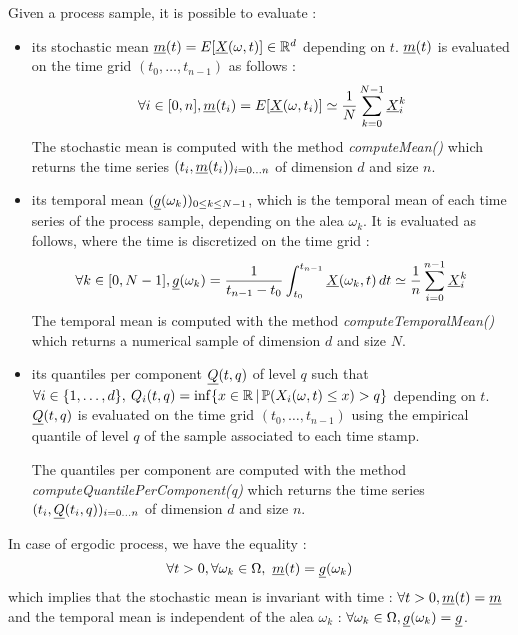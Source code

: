 Given a process sample, it is possible to evaluate :
\begin{itemize}
\item its stochastic mean  ${\underline{m}}(t) = E[\underline{X}(\omega,t)] \in \mathbb{R}^d$ depending on $t$.  ${\underline{m}}(t)$ is evaluated on the time grid $(t_0, \hdots, t_{n-1})$ as follows :
  \begin{equation}\label{stocMean}
    \forall  i\in[0,n], {\underline{m}}(t_i) = E[\underline{X}(\omega,t_i)]  \simeq \displaystyle  \frac{1}{N} \sum_{k=0}^{N-1} \underline{X}_i^k
  \end{equation}
  The stochastic mean is computed with the method \emph{computeMean()} which returns the time series  $(t_i,{\underline{m}}(t_i))_{i=0 \hdots n}$ of dimension $d$ and size $n$.

\item its temporal mean $({\underline{g}}(\omega_k))_{0 \leq k \leq N-1}$, which is the temporal mean of each time series of the process sample, depending on the alea $\omega_k$. It is evaluated as follows, where the time is discretized on the time grid :
  \begin{equation}\label{tempMean}
    \displaystyle \forall  k\in[0,N-1], {\underline{g}}(\omega_k) =  \frac{1}{t_{n-1} - t_0} \int_{t_0}^{t_{n-1}} \underline{X}(\omega_k,t) \, dt \simeq  \frac{1}{n} \sum_{i=0}^{n-1} \underline{X}_i^k
  \end{equation}
  The temporal mean is computed with the method \emph{computeTemporalMean()} which returns a numerical sample of dimension $d$ and size $N$.

\item its quantiles per component ${\underline{Q}}(t, q)$ of level $q$ such that $\forall i\in\{1,\dots,d\},\:Q_i(t, q) = \inf\{x\in{\mathbb R}\,|\,\mathbb{P}(X_i(\omega,t)\leq x)>q\}$ depending on $t$. ${\underline{Q}}(t, q)$ is evaluated on the time grid $(t_0, \hdots, t_{n-1})$ using the empirical quantile of level $q$ of the sample associated to each time stamp.

  The quantiles per component are computed with the method \emph{computeQuantilePerComponent(q)} which returns the time series  $(t_i,{\underline{Q}}(t_i, q))_{i=0 \hdots n}$ of dimension $d$ and size $n$.

\end{itemize}

In case of ergodic process, we have the equality :
\begin{equation}\label{ergodic}
  \forall t >0, \forall \omega_k\in \Omega, \ {\underline{m}}(t) =  {\underline{g}}(\omega_k)
\end{equation}
which implies that the stochastic mean is invariant with time : $\forall t >0, {\underline{m}}(t)={\underline{m}}$ and the temporal mean is independent of the alea $\omega_k$ : $ \forall \omega_k\in \Omega,  {\underline{g}}(\omega_k)= {\underline{g}}$.\\


